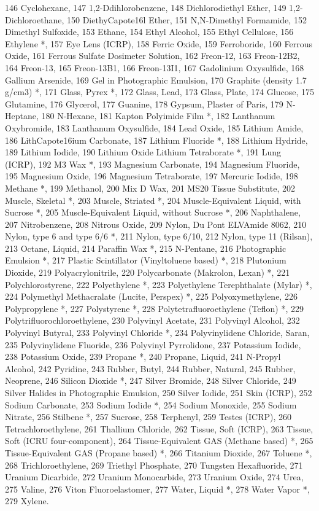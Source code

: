 \documentclass[a4paper,12pt]{article}
\begin{document}
\begin{large}
146 Cyclohexane, 147 1,2-Ddihlorobenzene, 148 Dichlorodiethyl Ether, 149 1,2-Dichloroethane, 150 DiethyCapote16l Ether, 151 N,N-Dimethyl Formamide, 152 Dimethyl Sulfoxide, 153 Ethane, 154 Ethyl Alcohol, 155 Ethyl Cellulose, 156 Ethylene *, 157 Eye Lens (ICRP), 158 Ferric Oxide, 159 Ferroboride, 160 Ferrous Oxide, 161 Ferrous Sulfate Dosimeter Solution, 162 Freon-12, 163 Freon-12B2, 164 Freon-13, 165 Freon-13B1, 166 Freon-13I1, 167 Gadolinium Oxysulfide, 168 Gallium Arsenide, 169 Gel in Photographic Emulsion, 170 Graphite (density 1.7 g/cm3) *, 171 Glass, Pyrex *, 172 Glass, Lead, 173 Glass, Plate, 174 Glucose, 175 Glutamine, 176 Glycerol, 177 Guanine, 178 Gypsum, Plaster of Paris, 179 N-Heptane, 180 N-Hexane, 181 Kapton Polyimide Film *, 182 Lanthanum Oxybromide, 183 Lanthanum Oxysulfide, 184 Lead Oxide, 185 Lithium Amide, 186 LithCapote16ium Carbonate, 187 Lithium Fluoride *, 188 Lithium Hydride, 189 Lithium Iodide, 190 Lithium Oxide	Lithium Tetraborate *, 191 Lung (ICRP), 192 M3 Wax *, 193 Magnesium Carbonate, 194 Magnesium Fluoride, 195 Magnesium Oxide, 196 Magnesium Tetraborate, 197 Mercuric Iodide, 198 Methane *, 199 Methanol, 200 Mix D Wax, 201 MS20 Tissue Substitute, 202 Muscle, Skeletal *, 203 Muscle, Striated *, 204 Muscle-Equivalent Liquid, with Sucrose *, 205 Muscle-Equivalent Liquid, without Sucrose *, 206 Naphthalene, 207 Nitrobenzene, 208 Nitrous Oxide, 209 Nylon, Du Pont ELVAmide 8062, 210 Nylon, type 6 and type 6/6 *, 211 Nylon, type 6/10, 212 Nylon, type 11 (Rilsan), 213 Octane, Liquid, 214 Paraffin Wax *, 215 N-Pentane, 216 Photographic Emulsion *, 217 Plastic Scintillator (Vinyltoluene based) *, 218 Plutonium Dioxide, 219 Polyacrylonitrile, 220 Polycarbonate (Makrolon, Lexan) *, 221 Polychlorostyrene, 222 Polyethylene *, 223 Polyethylene Terephthalate (Mylar) *, 224 Polymethyl Methacralate (Lucite, Perspex) *, 225 Polyoxymethylene, 226 Polypropylene *, 227 Polystyrene *, 228 Polytetrafluoroethylene (Teflon) *, 229 Polytrifluorochloroethylene, 230 Polyvinyl Acetate, 231 Polyvinyl Alcohol, 232 Polyvinyl Butyral, 233 Polyvinyl Chloride *, 234 Polyvinylidene Chloride, Saran, 235 Polyvinylidene Fluoride, 236 Polyvinyl Pyrrolidone, 237 Potassium Iodide, 238 Potassium Oxide, 239 Propane *, 240 Propane, Liquid, 241 N-Propyl Alcohol, 242 Pyridine, 243 Rubber, Butyl, 244 Rubber, Natural, 245 Rubber, Neoprene, 246 Silicon Dioxide *, 247 Silver Bromide, 248 Silver Chloride, 249 Silver Halides in Photographic Emulsion, 250 Silver Iodide, 251 Skin (ICRP), 252 Sodium Carbonate, 253 Sodium Iodide *, 254 Sodium Monoxide, 255 Sodium Nitrate, 256 Stilbene *, 257 Sucrose, 258 Terphenyl, 259 Testes (ICRP), 260 Tetrachloroethylene, 261 Thallium Chloride, 262 Tissue, Soft (ICRP), 263 Tissue, Soft (ICRU four-component), 264 Tissue-Equivalent GAS (Methane based) *, 265 Tissue-Equivalent GAS (Propane based) *, 266 Titanium Dioxide, 267 Toluene *, 268 Trichloroethylene, 269 Triethyl Phosphate, 270 Tungsten Hexafluoride, 271 Uranium Dicarbide, 272 Uranium Monocarbide, 273 Uranium Oxide, 274 Urea, 275 Valine, 276 Viton  Fluoroelastomer, 277 Water, Liquid *, 278 Water Vapor *, 279 Xylene.

\end{large}
\end{document}
